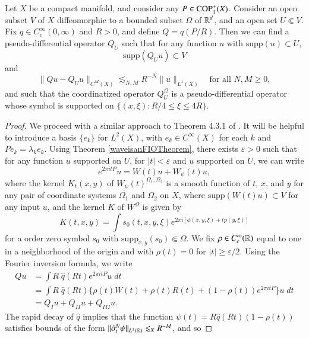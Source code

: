 \begin{theorem} \label{PseudoOsicllatoryLemma}
  Let $X$ be a compact manifold, and consider any $P \in {\text{COP}^{+}_{{1}}}(X)$. Consider an open subset $V$ of $X$ diffeomorphic to a bounded subset $\Omega$ of $\operatorname{\mathbb{R}}^d$, and an open set $U \Subset V$. Fix $q \in C_c^\infty(0,\infty)$ and $R > 0$, and define $Q = q(P/R)$. Then we can find a pseudo-differential operator $Q_U$ such that for any function $u$ with $\text{supp}(u) \subset U$,
  \[ \text{supp}(Q_U u) \subset V \]
  and
  \[ \| Qu - Q_U u \|_{C^M(X)} \lesssim_{N,M} R^{-N} \| u \|_{L^1(X)}\quad\text{for all $N,M \geq 0$}, \]
  and such that the coordinatized operator $Q_U^{\Omega}$ is a pseudo-differential operator whose symbol is supported on $\{ (x,\xi): R/4 \leq \xi \leq 4R \}$.
\end{theorem}
\begin{proof}
  We proceed with a similar approach to Theorem 4.3.1 of \cite{Sogge}. It will be helpful to introduce a basis $\{ e_k \}$ for $L^2(X)$, with $e_k \in C^\infty(X)$ for each $k$ and $Pe_k = \lambda_k e_k$. Using Theorem \ref{waveisanFIOTheorem}, there exists $\varepsilon > 0$ such that for any function $u$ supported on $U$, for $|t| < \varepsilon$ and $u$ supported on $U$, we can write
  \[ e^{2 \pi i t P} u = W(t) u + W_\psi(t) u, \]
  where the kernel $K_t(x,y)$ of $W_\psi(t)^{\Omega_1,\Omega_2}$ is a smooth function of $t$, $x$, and $y$ for any pair of coordinate systems $\Omega_1$ and $\Omega_2$ on $X$, where $\text{supp}(W(t) u) \subset V$ for any input $u$, and the kernel $K$ of $W^{\Omega}$ is given by
  \[ K(t,x,y) = \int s_0(t,x,y,\xi) e^{2 \pi i [ \phi(x,y,\xi) + t p(y,\xi) ]} \]
  for a order zero symbol $s_0$ with $\text{supp}_{x,y}(s_0) \Subset \Omega$. We fix $\rho \in C_c^\infty(\operatorname{\mathbb{R}})$ equal to one in a neighborhood of the origin and with $\rho(t) = 0$ for $|t| \geq \varepsilon / 2$. Using the Fourier inversion formula, we write
    \begin{equation}
    \begin{split}
        Qu &= \int R\;\! \widehat{q}(R t) e^{2 \pi i t P}u\; dt\\
        &= \int R\;\! \widehat{q}(Rt) \Big\{ \rho(t) W(t) + \rho(t) R(t) + (1 - \rho(t)) e^{2 \pi i t P} \Big\} u\; dt\\
        &= Q_I u + Q_{II} u + Q_{III} u.
    \end{split}
    \end{equation}
    The rapid decay of $\widehat{q}$ implies that the function $\psi(t) = R \widehat{q}(Rt) (1 - \rho(t))$ satisfies bounds of the form $\| \partial_t^N \psi \|_{L^1(\operatorname{\mathbb{R}})} \lesssim_X R^{-M}$, and so

\end{proof}
